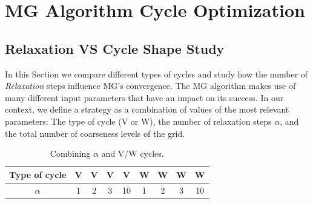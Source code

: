 \section{MG Algorithm Cycle Optimization}
\label{sec:pruning}

\subsection{Relaxation VS Cycle Shape Study}

In this Section we compare different types of cycles and study how the number
of \textit{Relaxation} steps influence MG's convergence.  The MG algorithm
makes use of many different input parameters that have an impact on its
success.  In our context, we define a strategy as a combination of values of
the most relevant parameters: The type of cycle (V or W), the number of
relaxation steps $\alpha$, and the total number of coarseness levels of the
grid.








\begin{table}[hbt]
 \begin{center}
  \begin{tabular}{|c|c|c|c|c|c|c|c|c|}
   \hline
   Type of cycle & V & V & V & V & W & W & W & W \\
   \hline
   $\alpha$ & 1 & 2 & 3 & 10 & 1 & 2 & 3 & 10 \\
   \hline
  \end{tabular}
 \end{center}
 \caption{Combining $\alpha$ and V/W cycles.}
 \label{table.strat1}
\end{table}

